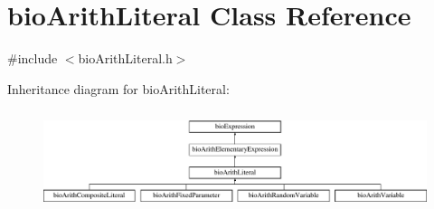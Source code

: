 \hypertarget{classbio_arith_literal}{}\section{bio\+Arith\+Literal Class Reference}
\label{classbio_arith_literal}


{\ttfamily \#include $<$bio\+Arith\+Literal.\+h$>$}

Inheritance diagram for bio\+Arith\+Literal\+:\begin{figure}[H]
\begin{center}
\leavevmode
\includegraphics[height=2.962963cm]{classbio_arith_literal}
\end{center}
\end{figure}
